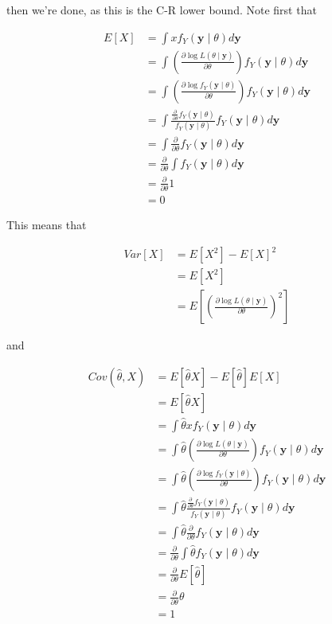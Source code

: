 \documentclass[
  letterpaper,
  DIV=11,
  numbers=noendperiod]{scrreprt}
\begin{document}
then we're done, as this is the C-R lower bound. Note first that

\begin{align*} 
E[X] & = \int x f_Y(\textbf{y} \mid \theta) d\textbf{y} \\
& = \int \left( \frac{\partial \log L(\theta \mid \textbf{y})}{\partial \theta} \right)  f_Y(\textbf{y} \mid \theta) d\textbf{y} \\
& = \int \left( \frac{\partial \log f_Y(\textbf{y} \mid \theta)}{\partial \theta} \right)  f_Y(\textbf{y} \mid \theta) d\textbf{y} \\
& = \int \frac{\frac{\partial}{\partial \theta} f_Y(\textbf{y} \mid \theta)}{ f_Y(\textbf{y} \mid \theta)} f_Y(\textbf{y} \mid \theta) d\textbf{y} \\
& = \int \frac{\partial}{\partial \theta} f_Y (\textbf{y} \mid \theta) d\textbf{y} \\
& = \frac{\partial}{\partial \theta} \int f_Y(\textbf{y} \mid \theta) d\textbf{y} \\
& = \frac{\partial}{\partial \theta} 1 \\
& = 0
\end{align*}

This means that

\begin{align*}
    Var[X] & = E[X^2] - E[X]^2 \\
    & = E[X^2] \\
    & = E \left[ \left( \frac{\partial \log L(\theta \mid \textbf{y})}{\partial \theta} \right)^2\right ]
\end{align*}

and

\begin{align*}
    Cov(\hat{\theta}, X) & = E[\hat{\theta} X] - E[\hat{\theta}] E[X] \\
    & = E[\hat{\theta}X] \\
    & = \int \hat{\theta} x f_Y(\textbf{y} \mid \theta) d\textbf{y} \\
    & = \int \hat{\theta} \left( \frac{\partial \log L(\theta \mid \textbf{y})}{\partial \theta} \right) f_Y(\textbf{y} \mid \theta) d\textbf{y} \\
    & = \int \hat{\theta} \left( \frac{\partial \log f_Y(\textbf{y} \mid \theta)}{\partial \theta} \right) f_Y(\textbf{y} \mid \theta) d\textbf{y} \\
    & = \int \hat{\theta} \frac{\frac{\partial}{\partial \theta} f_Y(\textbf{y} \mid \theta)}{ f_Y(\textbf{y} \mid \theta)} f_Y(\textbf{y} \mid \theta) d\textbf{y} \\
    & = \int \hat{\theta} \frac{\partial}{\partial \theta} f_Y(\textbf{y} \mid \theta) d\textbf{y}  \\
    & = \frac{\partial}{\partial \theta} \int \hat{\theta} f_Y(\textbf{y} \mid \theta) d\textbf{y}  \\
    & =  \frac{\partial}{\partial \theta} E[\hat{\theta}] \\
    & = \frac{\partial}{\partial \theta} \theta \\
    & = 1
\end{align*}
\end{document}
